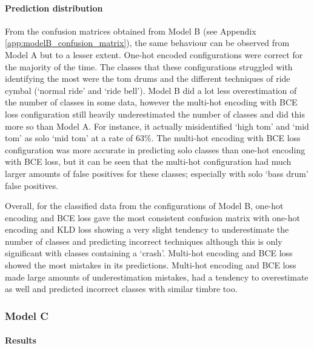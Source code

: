 \documentclass[12pt]{article}
\begin{document}
	\paragraph*{Prediction distribution}
	
	From the confusion matrices obtained from Model B (see Appendix \ref{app:modelB_confusion_matrix}), the same behaviour can be observed from Model A but to a lesser extent. One-hot encoded configurations were correct for the majority of the time. The classes that these configurations struggled with identifying the most were the tom drums and the different techniques of ride cymbal (`normal ride' and `ride bell'). Model B did a lot less overestimation of the number of classes in some data, however the multi-hot encoding with BCE loss configuration still heavily underestimated the number of classes and did this more so than Model A. For instance, it actually misidentified `high tom' and `mid tom' as solo `mid tom' at a rate of 63\%. The multi-hot encoding with BCE loss configuration was more accurate in predicting solo classes than one-hot encoding with BCE loss, but it can be seen that the multi-hot configuration had much larger amounts of false positives for these classes; especially with solo `bass drum' false positives.\medskip
	
	Overall, for the classified data from the configurations of Model B, one-hot encoding and BCE loss gave the most consistent confusion matrix with one-hot encoding and KLD loss showing a very slight tendency to underestimate the number of classes and predicting incorrect techniques although this is only significant with classes containing a `crash'. Multi-hot encoding and BCE loss showed the most mistakes in its predictions. Multi-hot encoding and BCE loss made large amounts of underestimation mistakes, had a tendency to overestimate as well and predicted incorrect classes with similar timbre too.\medskip
	
	\subsubsection{Model C}
	\label{sec:evaluation_analysis_modelC}
	
	\paragraph*{Results}
	
\end{document}
